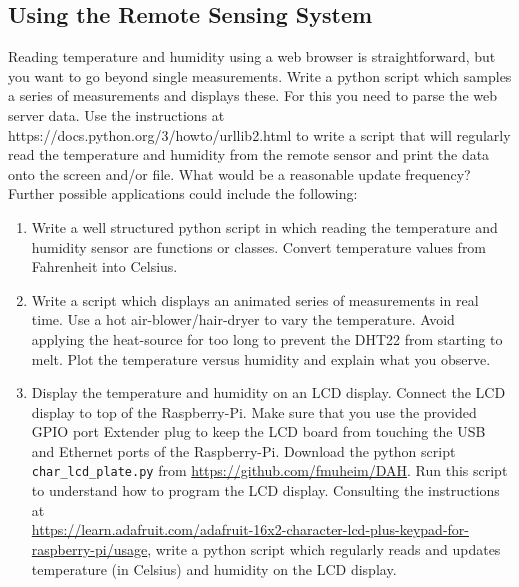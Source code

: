 \subsection{Using the  Remote Sensing System}

Reading temperature and humidity using a web browser is 
straightforward, but you want to go beyond single measurements.
Write a python script which samples a series of measurements
and displays these. For this you need to parse the web server data.
Use the instructions at
https://docs.python.org/3/howto/urllib2.html
to write a script that will regularly read the temperature and humidity from
the remote sensor and print the data onto the screen and/or file. What would be a reasonable
update frequency? Further possible applications could include the following:

\begin{enumerate}

\item Write a  well structured python script in which reading the temperature and humidity sensor are
functions or classes.  Convert temperature values from Fahrenheit into Celsius.

\item Write a script which displays an animated series of measurements in real time.
Use a hot air-blower/hair-dryer to vary the temperature. 
Avoid applying the heat-source for too long to prevent the DHT22 from starting to melt.
Plot the temperature versus humidity 
and explain what you observe.
 
\item Display the temperature and humidity on an  LCD display. 
Connect the LCD display to top of the Raspberry-Pi. 
Make sure that you use the provided GPIO port Extender plug to keep the LCD board from touching the  USB and Ethernet ports of the Raspberry-Pi. 
Download the python script {\tt  char\_lcd\_plate.py} from  \url{https://github.com/fmuheim/DAH}. Run this script to understand how to program the LCD display. Consulting the instructions at \\
\url{https://learn.adafruit.com/adafruit-16x2-character-lcd-plus-keypad-for-raspberry-pi/usage}, 
write a python script which regularly reads  and updates temperature (in Celsius) and humidity 
on the LCD display.

\end{enumerate}


